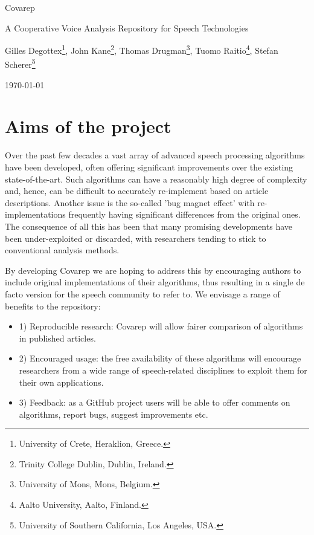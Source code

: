 \documentclass{article}
\date{\today}
\begin{document}
\vspace{1cm}
\centerline{\huge{Covarep}}
\vspace{1em}
\centerline{\large{A Cooperative Voice Analysis Repository for Speech Technologies}}
\vspace{1em}
\centerline{Gilles Degottex\footnote{University of Crete, Heraklion, Greece.}, John Kane\footnote{Trinity College Dublin, Dublin, Ireland.}, Thomas Drugman\footnote{University of Mons, Mons, Belgium.}, Tuomo Raitio\footnote{Aalto University, Aalto, Finland.}, Stefan Scherer\footnote{University of Southern California, Los Angeles, USA.}}
\vspace{1em}
\centerline{\today}

\vspace{16em}




\section{Aims of the project}
    Over the past few decades a vast array of advanced speech processing algorithms have been developed, often offering significant improvements over the existing state-of-the-art. Such algorithms can have a reasonably high degree of complexity and, hence, can be difficult to accurately re-implement based on article descriptions. Another issue is the so-called 'bug magnet effect' with re-implementations frequently having significant differences from the original ones. The consequence of all this has been that many promising developments have been under-exploited or discarded, with researchers tending to stick to conventional analysis methods.

    By developing Covarep we are hoping to address this by encouraging authors to include original implementations of their algorithms, thus resulting in a single de facto version for the speech community to refer to.
    We envisage a range of benefits to the repository:
    \begin{itemize}
    \item[] 1) Reproducible research: Covarep will allow fairer comparison of algorithms in published articles.
    \item[] 2) Encouraged usage: the free availability of these algorithms will encourage researchers from a wide range of speech-related disciplines to exploit them for their own applications.
    \item[] 3) Feedback: as a GitHub project users will be able to offer comments on algorithms, report bugs, suggest improvements etc.
    \end{itemize}
\end{document}
